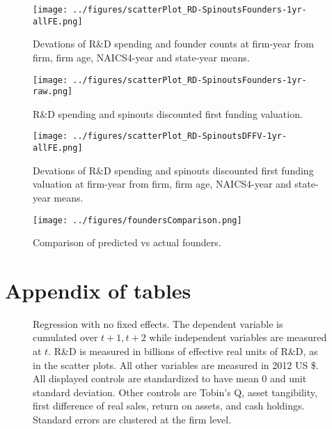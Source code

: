 \documentclass[12pt,english]{article}
\theoremstyle{remark}
\begin{document}
\begin{figure}[p]
	\centering
	\texttt{[image: ../figures/scatterPlot\_RD-SpinoutsFounders-1yr-allFE.png]}
	\caption{Devations of R\&D spending and founder counts at firm-year from firm, firm age, NAICS4-year and state-year means.}
	\label{scatter_rd_foundercounts_d}
\end{figure}


\begin{figure}[p]
	\centering
	\texttt{[image: ../figures/scatterPlot\_RD-SpinoutsFounders-1yr-raw.png]}
	\caption{R\&D spending and spinouts discounted first funding valuation.}
	\label{scatter_rd_dffv}
\end{figure}


\begin{figure}[p]
	\centering
	\texttt{[image: ../figures/scatterPlot\_RD-SpinoutsDFFV-1yr-allFE.png]}
	\caption{Devations of R\&D spending and spinouts discounted first funding valuation at firm-year from firm, firm age, NAICS4-year and state-year means.}
	\label{scatter_rd_dffv_d}
\end{figure}

\begin{figure}[p]
	\centering
	\texttt{[image: ../figures/foundersComparison.png]}
	\caption{Comparison of predicted vs actual founders.}
	\label{foundersComparison}
\end{figure}

\break
\section{Appendix of tables}

\renewcommand\thefigure{\thesection.\arabic{figure}}  
\setcounter{figure}{0}

\begin{figure}[p]
	\centering
	
	\caption{Regression with no fixed effects. The dependent variable is cumulated over $t+1,t+2$ while independent variables are measured at $t$. R\&D is measured in billions of effective real units of R\&D, as in the scatter plots. All other variables are measured in 2012 US \$. All displayed controls are standardized to have mean 0 and unit standard deviation. Other controls are Tobin's Q, asset tangibility, first difference of real sales, return on assets, and cash holdings. Standard errors are clustered at the firm level.}
	\label{regs_allSpinouts_nofe}
\end{figure}
\end{document}
